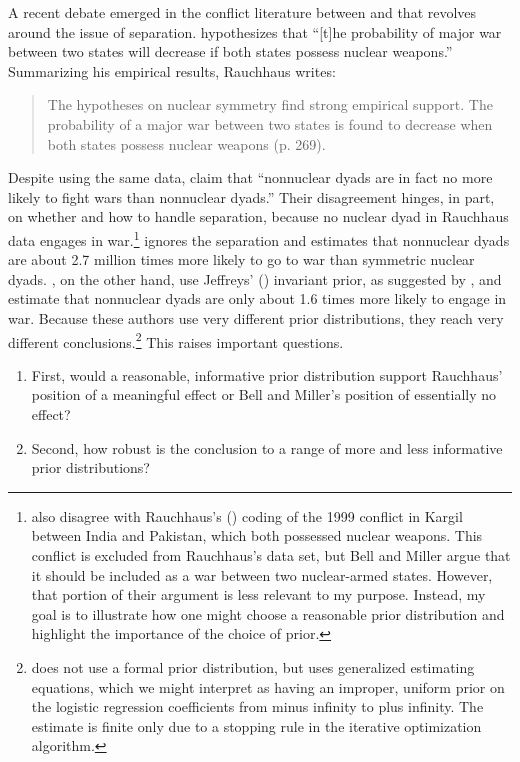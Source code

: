 \documentclass[12pt]{article}
\begin{document}
A recent debate emerged in the conflict literature between \cite{Rauchhaus2009} and \cite{BellMiller2015} that revolves around the issue of separation. 
\citet[p. 262]{Rauchhaus2009} hypothesizes that ``[t]he probability of major war between two states will decrease if both states possess nuclear weapons.'' 
Summarizing his empirical results, Rauchhaus writes:
\begin{quote} 
The hypotheses on nuclear symmetry find strong empirical support. The probability of a major war between two states is found to decrease when both states possess nuclear weapons (p. 269).
\end{quote}

Despite using the same data, \citet[p. 9]{BellMiller2015} claim that ``nonnuclear dyads are in fact no more likely to fight wars than nonnuclear dyads.'' 
Their disagreement hinges, in part, on whether and how to handle separation, because no nuclear dyad in Rauchhaus data engages in war.\footnote{
\cite{BellMiller2015} also disagree with Rauchhaus's (\citeyear{Rauchhaus2009}) coding of the 1999 conflict in Kargil between India and Pakistan, which both possessed nuclear weapons. 
This conflict is excluded from Rauchhaus's data set, but Bell and Miller argue that it should be included as a war between two nuclear-armed states. 
However, that portion of their argument is less relevant to my purpose. 
Instead, my goal is to illustrate how one might choose a reasonable prior distribution and highlight the importance of the choice of prior.} 
\cite{Rauchhaus2009} ignores the separation and estimates that nonnuclear dyads are about 2.7 million times more likely to go to war than symmetric nuclear dyads.
\cite{BellMiller2015}, on the other hand, use Jeffreys' (\citeyear{Jeffreys1946}) invariant prior, as suggested by \cite{Zorn2005}, and estimate that nonnuclear dyads are only about 1.6 times more likely to engage in war. 
Because these authors use very different prior distributions, they reach very different conclusions.\footnote{
\cite{Rauchhaus2009} does not use a formal prior distribution, but uses generalized estimating equations, which we might interpret as having an improper, uniform prior on the logistic regression coefficients from minus infinity to plus infinity. 
The estimate is finite only due to a stopping rule in the iterative optimization algorithm.} 
This raises important questions. 
\begin{enumerate}
\item First, would a reasonable, informative prior distribution support Rauchhaus' position of a meaningful effect or Bell and Miller's position of essentially no effect? 
\item Second, how robust is the conclusion to a range of more and less informative prior distributions?
\end{enumerate}
\end{document}
